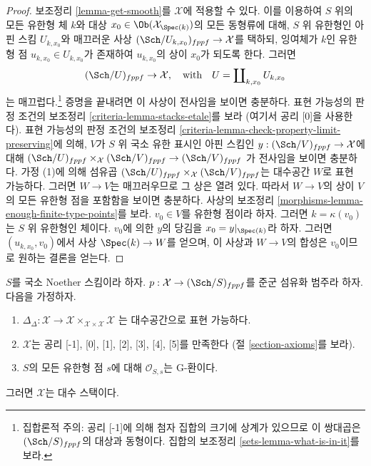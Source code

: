 \begin{proof}
보조정리 \ref{lemma-get-smooth}를 $\mathcal{X}$에 적용할 수 있다.
이를 이용하여 $S$ 위의 모든 유한형 체 $k$와 대상
$x_0 \in \Ob(\mathcal{X}_{\Spec(k)})$의 모든 동형류에 대해,
$S$ 위 유한형인 아핀 스킴 $U_{k, x_0}$와 매끄러운 사상
$(\Sch/U_{k, x_0})_{fppf} \to \mathcal{X}$를 택하되, 잉여체가 $k$인
유한형 점 $u_{k, x_0} \in U_{k, x_0}$가 존재하여 $u_{k, x_0}$의 상이
$x_0$가 되도록 한다. 그러면
$$
(\Sch/U)_{fppf} \to \mathcal{X},
\quad\text{with}\quad
U = \coprod\nolimits_{k, x_0} U_{k, x_0}
$$
는 매끄럽다.\footnote{집합론적 주의: 공리 [-1]에 의해 첨자 집합의
크기에 상계가 있으므로 이 쌍대곱은 $(\Sch/S)_{fppf}$의 대상과 동형이다.
집합의 보조정리 \ref{sets-lemma-what-is-in-it}를 보라.}
증명을 끝내려면 이 사상이 전사임을 보이면 충분하다.
표현 가능성의 판정 조건의 보조정리 \ref{criteria-lemma-stacks-etale}를
보라 (여기서 공리 [0]을 사용한다). 표현 가능성의 판정 조건의
보조정리 \ref{criteria-lemma-check-property-limit-preserving}에 의해,
$V$가 $S$ 위 국소 유한 표시인 아핀 스킴인
$y : (\Sch/V)_{fppf} \to \mathcal{X}$에 대해
$(\Sch/U)_{fppf} \times_\mathcal{X} (\Sch/V)_{fppf} \to (\Sch/V)_{fppf}$
가 전사임을 보이면 충분하다. 가정 (1)에 의해 섬유곱
$(\Sch/U)_{fppf} \times_\mathcal{X} (\Sch/V)_{fppf}$는 대수공간 $W$로
표현 가능하다. 그러면 $W \to V$는 매끄러우므로 그 상은 열려 있다.
따라서 $W \to V$의 상이 $V$의 모든 유한형 점을 포함함을 보이면
충분하다. 사상의 보조정리 \ref{morphisms-lemma-enough-finite-type-points}를
보라. $v_0 \in V$를 유한형 점이라 하자. 그러면 $k = \kappa(v_0)$는
$S$ 위 유한형인 체이다.
$v_0$에 의한 $y$의 당김을 $x_0 = y|_{\Spec(k)}$라 하자. 그러면
$(u_{k, x_0}, v_0)$에서 사상 $\Spec(k) \to W$를 얻으며, 이 사상과
$W \to V$의 합성은 $v_0$이므로 원하는 결론을 얻는다.
\end{proof}

\begin{proposition}
\label{proposition-second-diagonal-representable}
$S$를 국소 Noether 스킴이라 하자.
$p : \mathcal{X} \to (\Sch/S)_{fppf}$를 준군 섬유화 범주라 하자.
다음을 가정하자.
\begin{enumerate}
\item $\Delta_\Delta : \mathcal{X} \to
\mathcal{X} \times_{\mathcal{X} \times \mathcal{X}} \mathcal{X}$
는 대수공간으로 표현 가능하다.
\item $\mathcal{X}$는 공리 [-1], [0], [1], [2], [3], [4], [5]를 만족한다
(절 \ref{section-axioms}를 보라).
\item $S$의 모든 유한형 점 $s$에 대해 $\mathcal{O}_{S, s}$는 G-환이다.
\end{enumerate}
그러면 $\mathcal{X}$는 대수 스택이다.
\end{proposition}

